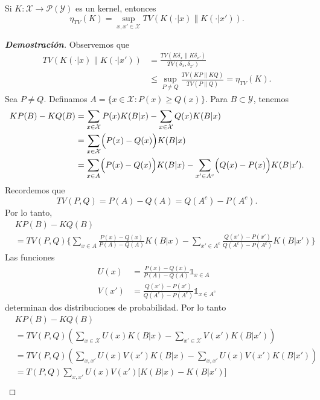 \begin{theorem}
Si $K\colon\mathcal{X}\to\mathcal{P}(\mathcal{Y})$ es un kernel, entonces 
\begin{equation*}
    \eta_{TV}(K)=\sup_{x,x'\in\mathcal{X}}TV(K(\cdot|x)\|K(\cdot|x')).
\end{equation*}
\end{theorem}
\begin{proof}[\textbf{Demostraci\'on}]
Observemos que
\begin{align*}
    TV(K(\cdot|x)\|K(\cdot|x'))&=\frac{TV(K\delta_x\|K\delta_{x'})}{TV(\delta_x,\delta_{x'})}\\
    &\leq \sup_{P\neq Q}\frac{TV(KP\|KQ)}{TV(P\|Q)}=\eta_{TV}(K).
\end{align*}
Sea $P\neq Q$. Definamos $A=\{x\in\mathcal{X}\colon P(x)\geq Q(x)\}$. Para $B\subset\mathcal{Y}$, tenemos 
\begin{align*}
    KP(B)-KQ(B)&=\sum_{x\in\mathcal{X}}P(x)K(B|x)-\sum_{x\in\mathcal{X}}Q(x)K(B|x)\\
    &=\sum_{x\in\mathcal{X}}\Bigl(P(x)-Q(x)\Bigl)K(B|x)\\
    &=\sum_{x\in A}\Bigl(P(x)-Q(x)\Bigl)K(B|x)-\sum_{x'\in A^c}\Bigl(Q(x)-P(x)\Bigl)K(B|x').
\end{align*}
Recordemos que 
\begin{equation*}
    TV(P,Q)=P(A)-Q(A)=Q(A^c)-P(A^c).
\end{equation*}
Por lo tanto,
\begin{align*}
    &KP(B)-KQ(B)\\
    &=TV(P,Q)\Bigg\{\sum_{x\in A}\frac{P(x)-Q(x)}{P(A)-Q(A)}K(B|x)-\sum_{x'\in A^c}\frac{Q(x')-P(x')}{Q(A^c)-P(A^c)}K(B|x')\Bigg\}
\end{align*}
Las funciones 
\begin{align*}
    U(x)&=\frac{P(x)-Q(x)}{P(A)-Q(A)}\mathds{1}_{x\in A}\\
    V(x')&=\frac{Q(x')-P(x')}{Q(A^c)-P(A^c)}\mathds{1}_{x\in A^c}
\end{align*}
determinan dos distribuciones de probabilidad. Por lo tanto
\begin{align*}
    &KP(B)-KQ(B)\\
    &=TV(P,Q)\left(\sum_{x\in\mathcal{X}}U(x)K(B|x)-\sum_{x'\in\mathcal{X}}V(x')K(B|x')\right)\\
    &=TV(P,Q)\left(\sum_{x,x'}U(x)V(x')K(B|x)-\sum_{x,x'}U(x)V(x')K(B|x')\right)\\
    &=T(P,Q)\sum_{x,x'}U(x)V(x')\Big[K(B|x)-K(B|x')\Big]\\

\end{align*}
\end{proof}
